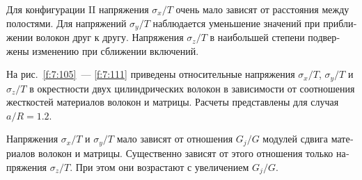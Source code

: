 \begin{russian}
Для конфигурации II напряжения $\sigma_x/T$ очень мало зависят от расстояния между полостями. Для напряжений $\sigma_y/T$ наблюдается уменьшение значений при приближении волокон друг к другу. Напряжения $\sigma_z/T$ в наибольшей степени подвержены изменению при сближении включений.
 
На рис.~\ref{f:7:105}~--- \ref{f:7:111} приведены относительные напряжения $\sigma_x/T$, $\sigma_y/T$ и $\sigma_z/T$ в окрестности двух цилиндрических волокон в зависимости от соотношения жесткостей материалов волокон и матрицы. Расчеты представлены для случая $a/R=1.2$.

Напряжения $\sigma_x/T$ и $\sigma_y/T$ мало зависят от отношения $G_j/G$ модулей сдвига материалов волокон и матрицы. Существенно зависят от этого отношения только напряжения $\sigma_z/T$. При этом они возрастают с увеличением $G_j/G$.


%



\end{russian}
